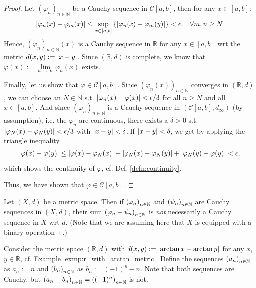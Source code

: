 \begin{proof}
	Let $(\varphi_n)_{n\in\mathbb N}$ be a Cauchy sequence in $\mathcal C[a, b]$, then for any $x\in [a, b]$:
	\begin{align}
		\abs{\varphi_n(x) - \varphi_m(x)} \leq \sup_{x\in [a, b]}\left\{ \abs{\varphi_{n}(x) - \varphi_{m}(y)} \right\} < \epsilon. \quad\forall m, n\geq N
	\end{align} 
	Hence, $(\varphi_n)_{n\in\mathbb N}(x)$ is a Cauchy sequence in $\mathbb R$ for any $x\in[a, b]$ wrt the metric $d(x, y) := \abs{x - y}$. Since $\left(\mathbb R, d\right)$ is complete, we know that $\varphi(x) := \lim\limits_{n\to\infty}\varphi_n(x)$ exists. 
	
	Finally, let us show that $\varphi\in\mathcal C[a, b]$. Since $\left(\varphi_n(x)\right)_{n\in\mathbb N}$ converges in $(\mathbb R, d)$, we can choose an $N\in\mathbb N$ s.t. $\abs{\varphi_n(x) - \varphi(x)} < \epsilon/3$ for all $n\geq N$ and all $x\in[a, b]$. And since $\left(\varphi_n\right)_{n\in\mathbb N}$ is a Cauchy sequence in $(\mathcal C[a, b], d_{\infty})$ (by assumption), i.e. the $\varphi_n$ are continuous, there exists a $\delta > 0$ s.t. $\abs{\varphi_N(x) - \varphi_{N}(y)} < \epsilon/3$ with $\abs{x - y} < \delta$. If $\abs{x-y} < \delta$, we get by applying the triangle inequality
	\begin{align}
		\abs{\varphi(x) - \varphi(y)} \leq \abs{\varphi(x) - \varphi_N(x)} + \abs{\varphi_N(x) - \varphi_N(y)} + \abs{\varphi_N(y) - \varphi(y)} < \epsilon,
	\end{align}
	which shows the continuity of $\varphi$, cf. Def. \ref{defn:continuity}.
	
	Thus, we have shown that $\varphi\in\mathcal C[a, b]$.
\end{proof}

\begin{remark}
	Let $(X, d)$ be a metric space. Then if $\seq[\varphi_n]$ and $\seq[\psi_n]$ are Cauchy sequences in $(X, d)$, their sum $\seq[\varphi_n + \psi_n]$ is \textit{not} necessarily a Cauchy sequence in $X$ wrt $d$. (Note that we are assuming here that $X$ is equipped with a binary operation $+$.)
\end{remark}

\begin{exmp}\label{exmp:counter_exmp_sum_Cauchy_not_Cauchy}
	Consider the metric space $(\mathbb R, d)$ with $d(x, y) := \abs{\arctan x - \arctan y}$ for any $x$, $y\in\mathbb R$, cf. Example \ref{exmp:r_with_arctan_metric}. Define the sequences $\seq[a_n]$ as $a_n := n$ and $\seq[b_n]$ as $b_n := (-1)^n - n$. Note that both sequences are Cauchy, but $\seq[a_n + b_n] = \seq[(-1)^n]$ is not.
\end{exmp}

